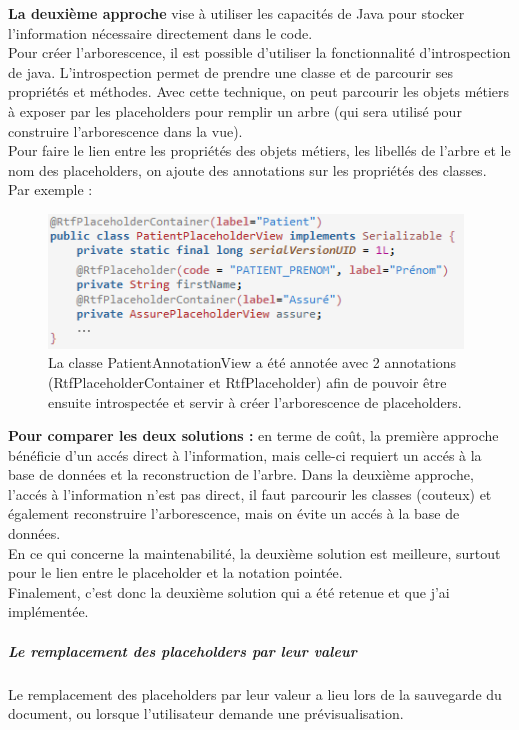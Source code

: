 \textbf{La deuxième approche} vise à utiliser les capacités de Java pour stocker l'information nécessaire directement dans le code.\\
Pour créer l'arborescence, il est possible d'utiliser la fonctionnalité d'introspection de java. L'introspection permet de prendre une classe et de parcourir ses propriétés et méthodes. Avec cette technique, on peut parcourir les objets métiers à exposer par les placeholders pour remplir un arbre (qui sera utilisé pour construire l'arborescence dans la vue). \\
Pour faire le lien entre les propriétés des objets métiers, les libellés de l'arbre et le nom des placeholders, on ajoute des annotations sur les propriétés des classes.\\
Par exemple :

\begin{figure}[H]
  \centering
  \includegraphics[width=11cm]{./img/annotations1}
  \caption{\label{fig:annotations} La classe PatientAnnotationView a été annotée avec 2 annotations (RtfPlaceholderContainer et RtfPlaceholder) afin de pouvoir être ensuite introspectée et servir à créer l'arborescence de placeholders.}
\end{figure}

\textbf{Pour comparer les deux solutions :} en terme de co\^ut, la première approche bénéficie d'un accés direct à l'information, mais celle-ci requiert un accés à la base de données et la reconstruction de l'arbre. Dans la deuxième approche, l'accés à l'information n'est pas direct, il faut parcourir les classes (couteux) et également reconstruire l'arborescence, mais on évite un accés à la base de données.\\
En ce qui concerne la maintenabilité, la deuxième solution est meilleure, surtout pour le lien entre le placeholder et la notation pointée.\\
Finalement, c'est donc la deuxième solution qui a été retenue et que j'ai implémentée.


\subparagraph*{Le remplacement des placeholders par leur valeur}
Le remplacement des placeholders par leur valeur a lieu lors de la sauvegarde du document, ou lorsque l'utilisateur demande une prévisualisation.\\

